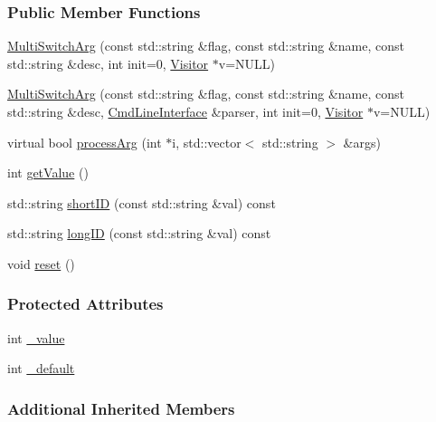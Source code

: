 \subsubsection*{Public Member Functions}
\begin{DoxyCompactItemize}
\item 
\hyperlink{classTCLAP_1_1MultiSwitchArg_a37db9658517f206fd69936e1458d59b0}{Multi\+Switch\+Arg} (const std\+::string \&flag, const std\+::string \&name, const std\+::string \&desc, int init=0, \hyperlink{classTCLAP_1_1Visitor}{Visitor} $\ast$v=N\+U\+LL)
\item 
\hyperlink{classTCLAP_1_1MultiSwitchArg_a0443d4a222630ac45aa67e40f2de3541}{Multi\+Switch\+Arg} (const std\+::string \&flag, const std\+::string \&name, const std\+::string \&desc, \hyperlink{classTCLAP_1_1CmdLineInterface}{Cmd\+Line\+Interface} \&parser, int init=0, \hyperlink{classTCLAP_1_1Visitor}{Visitor} $\ast$v=N\+U\+LL)
\item 
virtual bool \hyperlink{classTCLAP_1_1MultiSwitchArg_a91c3d349570f21d8af6dc90767d747a2}{process\+Arg} (int $\ast$i, std\+::vector$<$ std\+::string $>$ \&args)
\item 
int \hyperlink{classTCLAP_1_1MultiSwitchArg_a0389e414c11ebbab4a88dfbbf3af18bd}{get\+Value} ()
\item 
std\+::string \hyperlink{classTCLAP_1_1MultiSwitchArg_a083c07003f948691e94ce94d0b6376ed}{short\+ID} (const std\+::string \&val) const 
\item 
std\+::string \hyperlink{classTCLAP_1_1MultiSwitchArg_a0b0aacc09c93462bab4347f86db0fccd}{long\+ID} (const std\+::string \&val) const 
\item 
void \hyperlink{classTCLAP_1_1MultiSwitchArg_ac320530811dbca7fdcb2a41ab252fce4}{reset} ()
\end{DoxyCompactItemize}
\subsubsection*{Protected Attributes}
\begin{DoxyCompactItemize}
\item 
int \hyperlink{classTCLAP_1_1MultiSwitchArg_ab488d4bcdde96fc9edea87ee9b6f5839}{\+\_\+value}
\item 
int \hyperlink{classTCLAP_1_1MultiSwitchArg_afcd5b3e418e455af3d31aec1e300bb74}{\+\_\+default}
\end{DoxyCompactItemize}
\subsubsection*{Additional Inherited Members}


